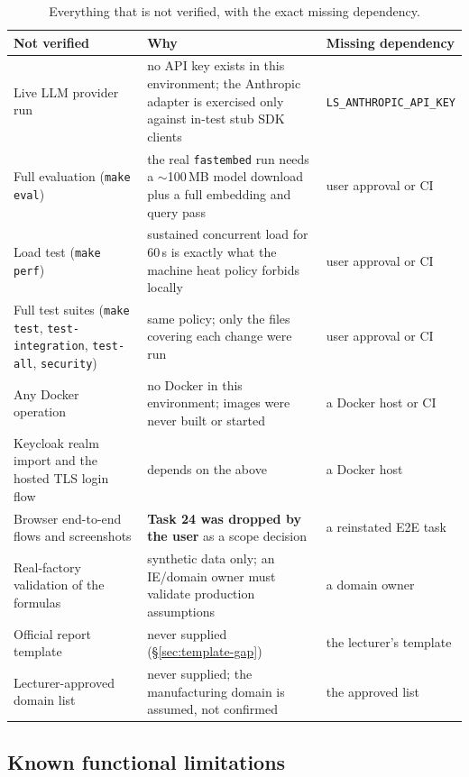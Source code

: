 \documentclass[11pt,a4paper]{article}
\begin{document}
\begin{table}[h]
\centering\small
\caption{Everything that is not verified, with the exact missing dependency.}
\begin{tabularx}{\linewidth}{@{}L{4.8cm}YL{3.4cm}@{}}
\toprule
\textbf{Not verified} & \textbf{Why} & \textbf{Missing dependency}\\
\midrule
Live LLM provider run & no API key exists in this environment; the Anthropic
adapter is exercised only against in-test stub SDK clients &
\texttt{LS\_ANTHROPIC\_API\_KEY}\\
Full evaluation (\texttt{make eval}) & the real \texttt{fastembed} run needs a
$\sim$100\,MB model download plus a full embedding and query pass &
user approval or CI\\
Load test (\texttt{make perf}) & sustained concurrent load for 60\,s is exactly
what the machine heat policy forbids locally & user approval or CI\\
Full test suites (\texttt{make test}, \texttt{test-integration},
\texttt{test-all}, \texttt{security}) & same policy; only the files covering each
change were run & user approval or CI\\
Any Docker operation & no Docker in this environment; images were never built or
started & a Docker host or CI\\
Keycloak realm import and the hosted TLS login flow & depends on the above &
a Docker host\\
Browser end-to-end flows and screenshots & \textbf{Task 24 was dropped by the
user} as a scope decision & a reinstated E2E task\\
Real-factory validation of the formulas & synthetic data only; an IE/domain owner
must validate production assumptions & a domain owner\\
Official report template & never supplied (\S\ref{sec:template-gap}) & the
lecturer's template\\
Lecturer-approved domain list & never supplied; the manufacturing domain is
assumed, not confirmed & the approved list\\
\bottomrule
\end{tabularx}
\end{table}

\subsection{Known functional limitations}
\end{document}
